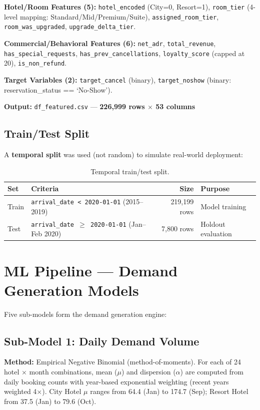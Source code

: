 \documentclass[12pt,a4paper,openany]{report}
\begin{document}
\textbf{Hotel/Room Features (5):} \texttt{hotel\_encoded} (City=0, Resort=1), \texttt{room\_tier} (4-level mapping: Standard/Mid/Premium/Suite), \texttt{assigned\_room\_tier}, \texttt{room\_was\_upgraded}, \texttt{upgrade\_delta\_tier}.

\textbf{Commercial/Behavioral Features (6):} \texttt{net\_adr}, \texttt{total\_revenue}, \texttt{has\_special\_requests}, \texttt{has\_prev\_cancellations}, \texttt{loyalty\_score} (capped at 20), \texttt{is\_non\_refund}.

\textbf{Target Variables (2):} \texttt{target\_cancel} (binary), \texttt{target\_noshow} (binary: reservation\_status == `No-Show').

\textbf{Output:} \texttt{df\_featured.csv} --- \textbf{226,999 rows $\times$ 53 columns}

\subsection{Train/Test Split}

A \textbf{temporal split} was used (not random) to simulate real-world deployment:

\begin{table}[H]
\centering
\caption{Temporal train/test split.}
\label{tab:split}
\begin{tabular}{@{}llrl@{}}
\toprule
\textbf{Set} & \textbf{Criteria} & \textbf{Size} & \textbf{Purpose} \\
\midrule
Train & \texttt{arrival\_date < 2020-01-01} (2015--2019) & 219,199 rows & Model training \\
Test  & \texttt{arrival\_date $\geq$ 2020-01-01} (Jan--Feb 2020) & 7,800 rows & Holdout evaluation \\
\bottomrule
\end{tabular}
\end{table}

\section{ML Pipeline --- Demand Generation Models}

Five sub-models form the demand generation engine:

\subsection{Sub-Model 1: Daily Demand Volume}

\textbf{Method:} Empirical Negative Binomial (method-of-moments). For each of 24 hotel $\times$ month combinations, mean ($\mu$) and dispersion ($\alpha$) are computed from daily booking counts with year-based exponential weighting (recent years weighted 4$\times$). City Hotel $\mu$ ranges from 64.4 (Jan) to 174.7 (Sep); Resort Hotel from 37.5 (Jan) to 79.6 (Oct).
\end{document}
